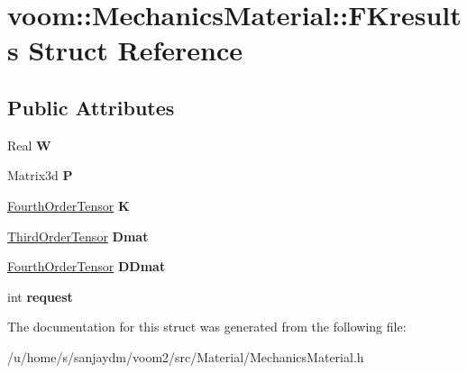 \hypertarget{structvoom_1_1_mechanics_material_1_1_f_kresults}{
\section{voom::MechanicsMaterial::FKresults Struct Reference}
\label{structvoom_1_1_mechanics_material_1_1_f_kresults}
}
\subsection*{Public Attributes}
\begin{DoxyCompactItemize}
\item 
\hypertarget{structvoom_1_1_mechanics_material_1_1_f_kresults_ae92fe3d359d9802327d63e5af0842277}{
Real {\bfseries W}}
\label{structvoom_1_1_mechanics_material_1_1_f_kresults_ae92fe3d359d9802327d63e5af0842277}

\item 
\hypertarget{structvoom_1_1_mechanics_material_1_1_f_kresults_acba4fc986eabebcfdc174e9e366b66e9}{
Matrix3d {\bfseries P}}
\label{structvoom_1_1_mechanics_material_1_1_f_kresults_acba4fc986eabebcfdc174e9e366b66e9}

\item 
\hypertarget{structvoom_1_1_mechanics_material_1_1_f_kresults_a26b9d1c5d2cab669ee8fd113257aba8b}{
\hyperlink{classvoom_1_1_fourth_order_tensor}{FourthOrderTensor} {\bfseries K}}
\label{structvoom_1_1_mechanics_material_1_1_f_kresults_a26b9d1c5d2cab669ee8fd113257aba8b}

\item 
\hypertarget{structvoom_1_1_mechanics_material_1_1_f_kresults_adda72c38bacf7c94216896007bfbe692}{
\hyperlink{classvoom_1_1_third_order_tensor}{ThirdOrderTensor} {\bfseries Dmat}}
\label{structvoom_1_1_mechanics_material_1_1_f_kresults_adda72c38bacf7c94216896007bfbe692}

\item 
\hypertarget{structvoom_1_1_mechanics_material_1_1_f_kresults_a13f698f0e65a0ab3377a0c60d17e0b9e}{
\hyperlink{classvoom_1_1_fourth_order_tensor}{FourthOrderTensor} {\bfseries DDmat}}
\label{structvoom_1_1_mechanics_material_1_1_f_kresults_a13f698f0e65a0ab3377a0c60d17e0b9e}

\item 
\hypertarget{structvoom_1_1_mechanics_material_1_1_f_kresults_a45815013b5540fbd8b3d69beccb0e6f2}{
int {\bfseries request}}
\label{structvoom_1_1_mechanics_material_1_1_f_kresults_a45815013b5540fbd8b3d69beccb0e6f2}

\end{DoxyCompactItemize}


The documentation for this struct was generated from the following file:\begin{DoxyCompactItemize}
\item 
/u/home/s/sanjaydm/voom2/src/Material/MechanicsMaterial.h\end{DoxyCompactItemize}
